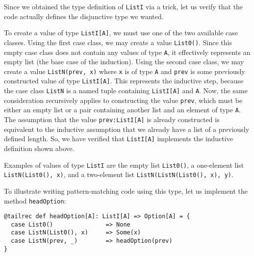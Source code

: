 Since we obtained the type definition of \lstinline!ListI! via a
trick, let us verify that the code actually defines the disjunctive
type we wanted. 

To create a value of type \lstinline!ListI[A]!, we must use one of
the two available case classes. Using the first case class, we may
create a value \lstinline!List0()!. Since this empty case class does
not contain any values of type \lstinline!A!, it effectively represents
an empty list (the base case of the induction). Using the second case
class, we may create a value \lstinline!ListN(prev, x)! where \lstinline!x!
is of type \lstinline!A! and \lstinline!prev! is some previously
constructed value of type \lstinline!ListI[A]!. This represents the
inductive step, because the case class \lstinline!ListN! is a named
tuple containing \lstinline!ListI[A]! and \lstinline!A!. Now, the
same consideration recursively applies to constructing the value \lstinline!prev!,
which must be either an empty list or a pair containing another list
and an element of type \lstinline!A!. The assumption that the value
\lstinline!prev:ListI[A]! is already constructed is equivalent to
the inductive assumption that we already have a list of a previously
defined length. So, we have verified that \lstinline!ListI[A]! implements
the inductive definition shown above.

Examples of values of type \lstinline!ListI! are the empty list \lstinline!List0()!,
a one-element list \lstinline!ListN(List0(), x)!, and a two-element
list \lstinline!ListN(ListN(List0(), x), y)!.

To illustrate writing pattern-matching code using this type, let us
implement the method \lstinline!headOption!:
\begin{lstlisting}
@tailrec def headOption[A]: ListI[A] => Option[A] = {
  case List0()               => None
  case ListN(List0(), x)     => Some(x)
  case ListN(prev, _)        => headOption(prev)
}
\end{lstlisting}


